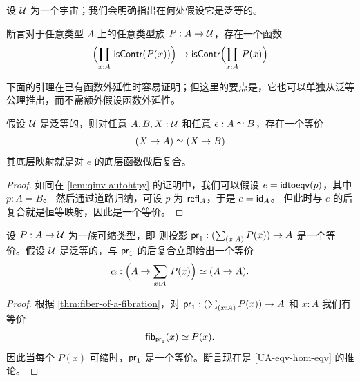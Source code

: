 %
设 $\type$ 为一个宇宙；我们会明确指出在何处假设它是泛等的。

\begin{defn}\label{weakfunext}
%
断言对于任意类型 $A$ 上的任意类型族 $P:A\to\type$，存在一个函数
\begin{equation*}
\Parens{\prd{x:A}\iscontr(P(x))} \to\iscontr\Parens{\prd{x:A}P(x)}
\end{equation*}
\end{defn}

下面的引理在已有函数外延性时容易证明；但这里的要点是，它也可以单独从泛等公理推出，而不需额外假设函数外延性。

\begin{lem} \label{UA-eqv-hom-eqv}
假设 $\type$ 是泛等的，则对任意 $A,B,X:\type$ 和任意 $e:\eqv{A}{B}$，存在一个等价
\begin{equation*}
\eqv{(X\to A)}{(X\to B)}
\end{equation*}
其底层映射就是对 $e$ 的底层函数做后复合。
\end{lem}

\begin{proof}
  如同在 \cref{lem:qinv-autohtpy} 的证明中，我们可以假设 $e = \idtoeqv(p)$，其中 $p:A=B$。
  然后通过道路归纳，可设 $p$ 为 $\refl{A}$，于是 $e = \idfunc[A]$。
  但此时与 $e$ 的后复合就是恒等映射，因此是一个等价。
\end{proof}

\begin{cor}\label{contrfamtotalpostcompequiv}
设 $P:A\to\type$ 为一族可缩类型，即 
则投影 $\proj{1}:(\sm{x:A}P(x))\to A$ 是一个等价。假设 $\type$ 是泛等的，与 $\proj{1}$ 的后复合立即给出一个等价
\begin{equation*}
\alpha : \eqv{\Parens{A\to\sm{x:A}P(x)}}{(A\to A)}.
\end{equation*}
\end{cor}

\begin{proof}
  根据 \cref{thm:fiber-of-a-fibration}，对 $\proj{1}:(\sm{x:A}P(x))\to A$ 和 $x:A$ 我们有等价
  \begin{equation*}
    \eqv{\hfiber{\proj{1}}{x}}{P(x)}.
  \end{equation*}
  因此当每个 $P(x)$ 可缩时，$\proj{1}$ 是一个等价。断言现在是 \cref{UA-eqv-hom-eqv} 的推论。
\end{proof}

